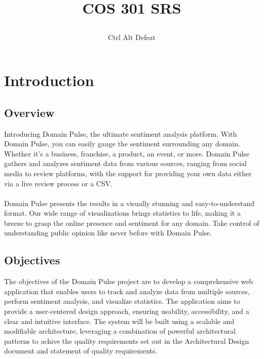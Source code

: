 \documentclass[12pt]{article}
\title{

\\
{COS 301 SRS}
}
\author{Ctrl Alt Defeat}
\begin{document}



\tableofcontents

\newpage











\section{Introduction}

\subsection{Overview}
Introducing Domain Pulse, the ultimate sentiment analysis platform. With Domain Pulse, you can easily gauge the sentiment surrounding any domain. Whether it's a business, franchise, a product, an event, or more. Domain Pulse gathers and analyzes sentiment data from various sources, ranging from social media to review platforms, with the support for providing your own data either via a live review process or a CSV.\\
\\Domain Pulse presents the results in a visually stunning and easy-to-understand format. Our wide range of visualizations brings statistics to life, making it a breeze to grasp the online presence and sentiment for any domain. Take control of understanding public opinion like never before with Domain Pulse.
\subsection{Objectives}

The objectives of the Domain Pulse project are to develop a comprehensive web application that enables users to track and analyze data from multiple sources, perform sentiment analysis, and visualize statistics. The application aims to provide a user-centered design approach, ensuring usability, accessibility, and a clear and intuitive interface. The system will be built using a scalable and modifiable architecture, leveraging a combination of powerful architectural patterns to achive the quality requirements set out in the Architectural Design document and statement of quality requirements.

\newpage
\end{document}
